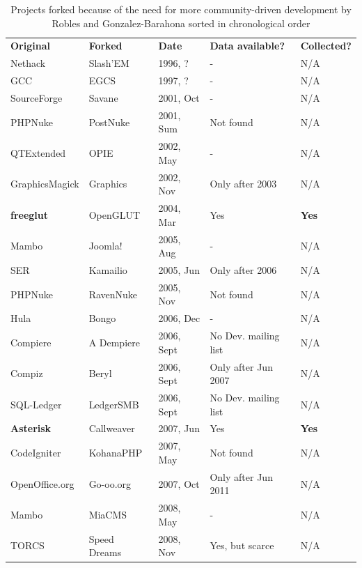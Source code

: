\documentclass[conference]{IEEEtran}
\begin{document}

\begin{table}[!htbp]
\centering
\caption{Projects forked because of the need for more community-driven development by Robles and Gonzalez-Barahona \cite{Robles} sorted in chronological order}
\label{tableProjectsForkedCat2CommunityDriven}
\begin{tabular}{m{} m{} m{} m{} m{}}
\textbf{Original} & \textbf{Forked} & \textbf{Date} & \textbf{Data available?} & \textbf{Collected?}\\
\noalign{\smallskip}\hline\noalign{\smallskip}
Nethack & Slash'EM & 1996, ? & - & N/A \\ \hline
GCC & EGCS & 1997, ? & - & N/A \\ \hline
SourceForge & Savane & 2001, Oct & - & N/A \\ \hline
PHPNuke & PostNuke & 2001, Sum & Not found & N/A \\ \hline
QTExtended & OPIE & 2002, May & - & N/A \\ \hline
GraphicsMagick & Graphics & 2002, Nov  & Only after 2003 & N/A \\ \hline
\textbf{freeglut} & OpenGLUT & 2004, Mar & Yes & \textbf{Yes} \\ \hline
Mambo & Joomla! & 2005, Aug & - & N/A \\ \hline
SER & Kamailio & 2005, Jun & Only after 2006 & N/A \\ \hline
PHPNuke & RavenNuke & 2005, Nov & Not found & N/A \\ \hline
Hula & Bongo & 2006, Dec & - & N/A \\ \hline
Compiere & A Dempiere & 2006, Sept & No Dev. mailing list & N/A \\ \hline
Compiz & Beryl & 2006, Sept & Only after Jun 2007 & N/A \\ \hline
SQL-Ledger & LedgerSMB & 2006, Sept & No Dev. mailing list & N/A \\ \hline
\textbf{Asterisk} & Callweaver & 2007, Jun & Yes & \textbf{Yes} \\ \hline
CodeIgniter & KohanaPHP & 2007, May & Not found & N/A \\ \hline
OpenOffice.org & Go-oo.org & 2007, Oct & Only after Jun 2011 & N/A \\ \hline
Mambo & MiaCMS & 2008, May & - & N/A \\ \hline
TORCS & Speed Dreams & 2008, Nov & Yes, but scarce & N/A \\ \hline

\end{tabular}
\end{table}
\end{document}
